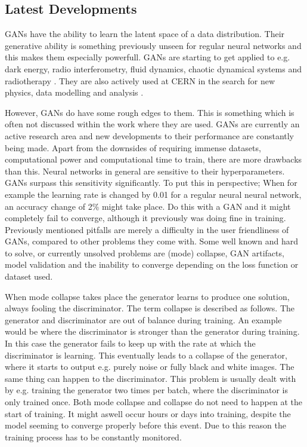 \subsection{Latest Developments}
GANs have the ability to learn the latent space of a data distribution. Their generative ability is something previously unseen for regular neural networks and this makes them especially powerfull. GANs are starting to get applied to e.g. dark energy, radio interferometry, fluid dynamics, chaotic dynamical systems and radiotherapy \cite{li2019model,glaser2019radiogan,werhahn2019multi,wu2019enforcing,kazemifar2019mri}. They are also actively used at CERN in the search for new physics, data modelling and analysis \cite{lin2019machine, di2019dijetgan, hashemi2019lhc, chekalina2018generative, paganini2018calogan, maevskiy2019fast, paganini2019machine}. 


However, GANs do have some rough edges to them. This is something which is often not discussed within the work where they are used. GANs are currently an active research area and new developments to their performance are constantly being made. Apart from the downsides of requiring immense datasets, computational power and computational time to train, there are more drawbacks than this. Neural networks in general are sensitive to their hyperparameters. GANs surpass this sensitivity significantly. To put this in perspective; When for example the learning rate is changed by 0.01 for a regular neural neural network, an accuracy change of 2\% might take place. Do this with a GAN and it might completely fail to converge, although it previously was doing fine in training. Previously mentioned pitfalls are merely a difficulty in the user friendliness of GANs, compared to other problems they come with. Some well known and hard to solve, or currently unsolved problems are (mode) collapse, GAN artifacts, model validation and the inability to converge depending on the loss function or dataset used. 

When mode collapse takes place the generator learns to produce one solution, always fooling the discriminator. The term collapse is described as follows. The generator and discriminator are out of balance during training. An example would be where the discriminator is stronger than the generator during training. In this case the generator fails to keep up with the rate at which the discriminator is learning. This eventually leads to a collapse of the generator, where it starts to output e.g. purely noise or fully black and white images. The same thing can happen to the discriminator. This problem is usually dealt with by e.g. training the generator two times per batch, where the discriminator is only trained once. Both mode collapse and collapse do not need to happen at the start of training. It might aswell occur hours or days into training, despite the model seeming to converge properly before this event. Due to this reason the training process has to be constantly monitored.

